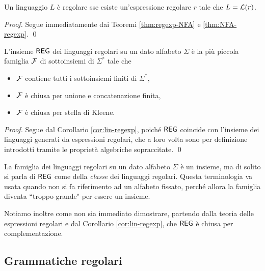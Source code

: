 \documentclass[runningheads,a4paper]{llncs}
\begin{document}
\begin{corollary}\label{cor:lin-regexp}
Un linguaggio $L$ \`{e} regolare sse esiste un'espressione regolare $r$ tale che $L = \mathcal{L}(r)$.
\end{corollary}

\begin{proof}
Segue immediatamente dai Teoremi \ref{thm:regexp-NFA} e \ref{thm:NFA-regexp}.
\qed\end{proof}

\begin{theorem}\label{thm:Kleene-reglin}
L'insieme $\mathsf{REG}$ dei linguaggi regolari su un dato alfabeto $\Sigma$ \`{e} la pi\`{u} piccola famiglia $\mathcal{F}$ di sottoinsiemi di $\Sigma^*$ tale che 
\begin{itemize}
\item $\mathcal{F}$ contiene tutti i sottoinsiemi finiti di $\Sigma^*$,
\item $\mathcal{F}$ \`{e} chiusa per unione e concatenazione finita,
\item $\mathcal{F}$ \`{e} chiusa per stella di Kleene.
\end{itemize}
\end{theorem}

\begin{proof}
Segue dal Corollario \ref{cor:lin-regexp}, poich\'{e} $\mathsf{REG}$ coincide con l'insieme dei linguaggi generati da espressioni regolari, che a loro volta sono per definizione introdotti tramite le propriet\`{a} algebriche sopraccitate.
\qed\end{proof}

La famiglia dei linguaggi regolari su un dato alfabeto $\Sigma$ \`{e} un insieme, ma di solito si parla di $\mathsf{REG}$ come della \emph{classe} dei linguaggi regolari. Questa terminologia va usata quando non si fa riferimento ad un alfabeto fissato, perch\'{e} allora la famiglia diventa ``troppo grande" per essere un insieme.

Notiamo inoltre come non sia immediato dimostrare, partendo dalla teoria delle espressioni regolari e dal Corollario \ref{cor:lin-regexp}, che $\mathsf{REG}$ \`{e} chiusa per complementazione.

\subsection{Grammatiche regolari}
\end{document}
